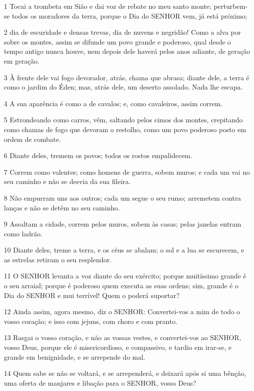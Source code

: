 \par 1 Tocai a trombeta em Sião e dai voz de rebate no meu santo monte; perturbem-se todos os moradores da terra, porque o Dia do SENHOR vem, já está próximo;
\par 2 dia de escuridade e densas trevas, dia de nuvens e negridão! Como a alva por sobre os montes, assim se difunde um povo grande e poderoso, qual desde o tempo antigo nunca houve, nem depois dele haverá pelos anos adiante, de geração em geração.
\par 3 À frente dele vai fogo devorador, atrás, chama que abrasa; diante dele, a terra é como o jardim do Éden; mas, atrás dele, um deserto assolado. Nada lhe escapa.
\par 4 A sua aparência é como a de cavalos; e, como cavaleiros, assim correm.
\par 5 Estrondeando como carros, vêm, saltando pelos cimos dos montes, crepitando como chamas de fogo que devoram o restolho, como um povo poderoso posto em ordem de combate.
\par 6 Diante deles, tremem os povos; todos os rostos empalidecem.
\par 7 Correm como valentes; como homens de guerra, sobem muros; e cada um vai no seu caminho e não se desvia da sua fileira.
\par 8 Não empurram uns aos outros; cada um segue o seu rumo; arremetem contra lanças e não se detêm no seu caminho.
\par 9 Assaltam a cidade, correm pelos muros, sobem às casas; pelas janelas entram como ladrão.
\par 10 Diante deles, treme a terra, e os céus se abalam; o sol e a lua se escurecem, e as estrelas retiram o seu resplendor.
\par 11 O SENHOR levanta a voz diante do seu exército; porque muitíssimo grande é o seu arraial; porque é poderoso quem executa as suas ordens; sim, grande é o Dia do SENHOR e mui terrível! Quem o poderá suportar?
\par 12 Ainda assim, agora mesmo, diz o SENHOR: Convertei-vos a mim de todo o vosso coração; e isso com jejuns, com choro e com pranto.
\par 13 Rasgai o vosso coração, e não as vossas vestes, e convertei-vos ao SENHOR, vosso Deus, porque ele é misericordioso, e compassivo, e tardio em irar-se, e grande em benignidade, e se arrepende do mal.
\par 14 Quem sabe se não se voltará, e se arrependerá, e deixará após si uma bênção, uma oferta de manjares e libação para o SENHOR, vosso Deus?
